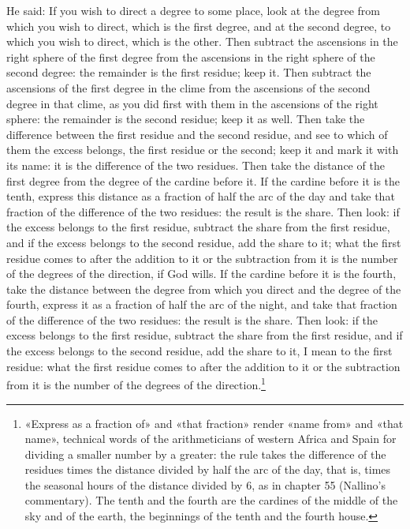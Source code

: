 \documentclass[11pt]{article}
\newcommand{\ArPage}[1]{\marginpar{\footnotesize\color{gray}Ar.\,p.\,#1}}
\begin{document}
\par \ArPage{225}He said: If you wish to direct a degree to some place, look at the degree from which you wish to direct, which is the first degree, and at the second degree, to which you wish to direct, which is the other. Then subtract the ascensions in the right sphere of the first degree from the ascensions in the right sphere of the second degree: the remainder is the first residue; keep it. Then subtract the ascensions of the first degree in the clime from the ascensions of the second degree in that clime, as you did first with them in the ascensions of the right sphere: the remainder is the second residue; keep it as well. Then take the difference between the first residue and the second residue, and see to which of them the excess belongs, the first residue or the second; keep it and mark it with its name: it is the difference of the two residues. Then take the distance of the first degree from the degree of the cardine before it. If the cardine before it is the tenth, express this distance as a fraction of half the arc of the day and take that fraction of the difference of the two residues: the result is the share. Then look: if the excess belongs to the first residue, subtract the share from the first residue, and if the excess belongs to the second residue, add the share to it; what the first residue comes to after the addition to it or the subtraction from it is the number of the degrees of the direction, if God wills. If the cardine before it is the fourth, take the distance between the degree from which you direct and the degree of the fourth, express it as a fraction of half the arc of the night, and take that fraction of the difference of the two residues: the result is the share. Then look: if the excess belongs to the first residue, subtract the share from the first residue, and if the excess belongs to the second residue, add the share to it, I mean to the first residue: what the first residue comes to after the addition to it or the subtraction from it is the number of the degrees of the direction.\footnote{«Express as a fraction of» and «that fraction» render «name from» and «that name», technical words of the arithmeticians of western Africa and Spain for dividing a smaller number by a greater: the rule takes the difference of the residues times the distance divided by half the arc of the day, that is, times the seasonal hours of the distance divided by 6, as in chapter 55 (Nallino's commentary). The tenth and the fourth are the cardines of the middle of the sky and of the earth, the beginnings of the tenth and the fourth house.}\par
\end{document}
